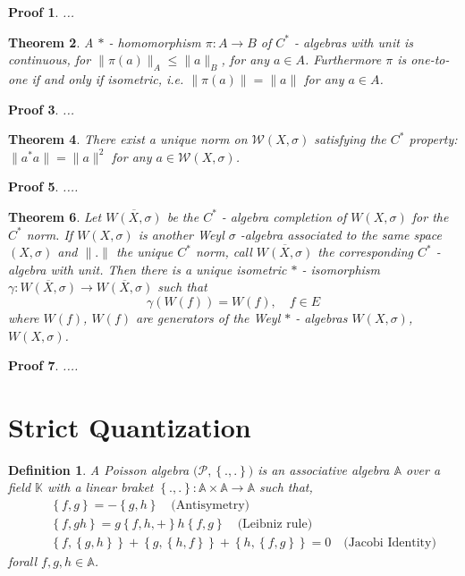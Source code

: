 \documentclass[10pt]{article} %
\numberwithin{equation}{section}
\numberwithin{equation}{section} %
\numberwithin{figure}{section} %
\newcommand{\norm}[1]{\|{#1}\|} %
\newcommand{\PB}[2]{\left\{{#1},{#2}\right\}} %
\theoremstyle{theoremsf}
\newtheorem{thm}{Theorem}[section]
\newtheorem{demo}[thm]{Proof}
\theoremstyle{definitionsf}
\newtheorem{dfn}{Definition}[section]
\begin{document}
\begin{demo}
 ...
\end{demo}

\begin{thm}
 A $\ast$ - homomorphism $\pi : A \to B$ of $C^\ast$ - algebras with unit is continuous, for $\norm{\pi(a)}_{A} \leq \norm{a}_{B}$, for any $a \in A$. Furthermore $\pi$ is one-to-one if and only if isometric, i.e. $\norm{\pi(a)} = \norm{a}$ for any $a \in A$.
\end{thm}

\begin{demo}
 ...
\end{demo}

\begin{thm}
 There exist a unique norm on $\mathcal{W} (X, \sigma )$ satisfying the $C^\ast$ property: $\norm{a^\ast a} = \norm{a}^2$ for any $a \in  \mathcal{W} (X, \sigma )$.
\end{thm}

\begin{demo}
 ....
\end{demo}

\begin{thm}
 Let $\overline{W (X,\sigma)}$ be the $C^{\ast}$ - algebra completion of $W (X,\sigma)$ for the $C^\ast$ norm. If $W (X,\sigma)$ is another Weyl $\sigma$ -algebra associated to the same space $(X,\sigma)$ and $\norm{.}$ the unique $C^\ast$ norm, call $\overline{W (X,\sigma)}$ the corresponding $C^{\ast}$ - algebra with unit. Then there is a unique isometric $\ast$ - isomorphism $\gamma : \overline{W (X,\sigma)} \to \overline{W (X,\sigma)}$ such that
 \begin{equation}
  \gamma( W (f) ) = W (f), \quad f \in E 
 \end{equation}
 where $W(f)$, $W(f)$ are generators of the Weyl $\ast$ - algebras $W(X,\sigma)$, $W(X,\sigma)$.
\end{thm}

\begin{demo}
 ....
\end{demo}

\section{Strict Quantization}

\begin{dfn}
 A Poisson algebra $\big(\mathcal{P},\PB{.}{.}\big)$ is an associative algebra $\mathbb{A}$ over a field $\mathbb{K}$ with a linear braket $\PB{.}{.} : \mathbb{A} \times \mathbb{A} \rightarrow \mathbb{A}$ such that,
 \begin{eqnarray}
  && \PB{f}{g} = - \PB{g}{h} \quad \text{(Antisymetry)} \\
  && \PB{f}{gh} = g\PB{f,h} + h\PB{f}{g} \quad \text{(Leibniz rule)} \\
  && \PB{f}{\PB{g}{h}} + \PB{g}{\PB{h}{f}} + \PB{h}{\PB{f}{g}} = 0 \quad \text{(Jacobi Identity)}
 \end{eqnarray}
 forall $f,g,h \in \mathbb{A}$.
\end{dfn}
\end{document}
